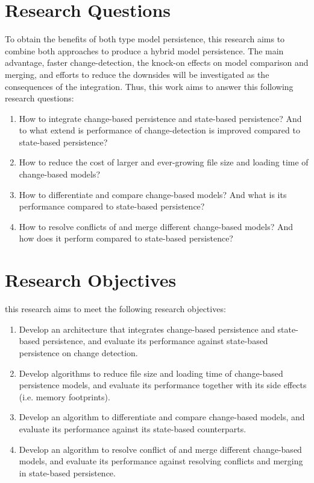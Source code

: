 \documentclass[12pt, a4paper]{report} \usepackage[titletoc]{appendix}
\begin{document}
\section{Research Questions}
\label{sec:research_questions}
To obtain the benefits of both type model persistence, this research aims to combine both approaches to produce a hybrid model persistence. The main advantage, faster change-detection, the knock-on effects on model comparison and merging, and efforts to reduce the downsides will be investigated as the consequences of the integration. Thus, this work aims to answer this following research questions: 
\begin{enumerate} 
	\item How to integrate change-based persistence and state-based persistence? And to what extend is performance of change-detection is improved compared to state-based persistence? 
	\item How to reduce the cost of larger and ever-growing file size and loading time of change-based models?
	\item How to differentiate and compare change-based models? And what is its performance compared to state-based persistence?
	\item How to resolve conflicts of and merge different change-based models? And how does it perform compared to state-based persistence?
\end{enumerate}

\section{Research Objectives}
\label{sec:research_objectives}
this research aims to meet the following research objectives:
\begin{enumerate}
	\item Develop an architecture that integrates change-based persistence and state-based persistence, and evaluate its performance against state-based persistence on change detection.
	\item Develop algorithms to reduce file size and loading time of change-based persistence models, and evaluate its performance together with its side effects (i.e. memory footprints). 
	\item Develop an algorithm to differentiate and compare change-based models, and evaluate its performance against its state-based counterparts.
	\item Develop an algorithm to resolve conflict of and merge different change-based models, and evaluate its performance against resolving conflicts and merging in state-based persistence. 
\end{enumerate}
\end{document}
